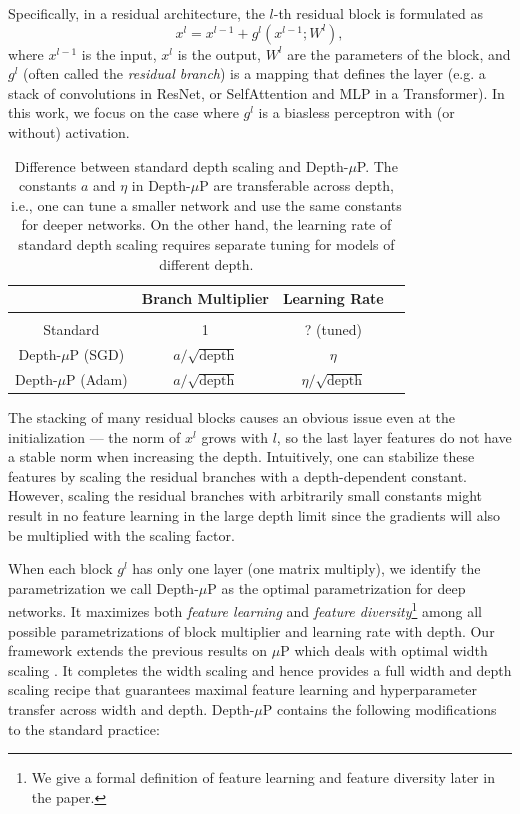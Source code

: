 Specifically, in a residual architecture, the $l$-th residual block is formulated as
\[x^l=x^{l-1} + g^l(x^{l-1};W^l),\] 
where $x^{l-1}$ is the input, $x^l$ is the output, $W^l$ are the parameters of the block, and $g^l$ (often called the \emph{residual branch}) is a mapping that defines the layer (e.g. a stack of convolutions in ResNet, or SelfAttention and MLP in a Transformer). In this work, we focus on the case where $g^l$ is a biasless perceptron with (or without) activation.

\begin{table}[t]
\begin{center}
\caption{Difference between standard depth scaling and Depth-$\mu$P. The constants $a$ and $\eta$ in Depth-$\mu$P are transferable across depth, i.e., one can tune a smaller network and use the same constants for deeper networks. On the other hand, the learning rate of standard depth scaling requires separate tuning for models of different depth. }
\begin{tabular}{c c c c} 
 \hline
  & Branch Multiplier & Learning Rate  \\
 \hline
 \vspace{-0.7em}
 \\
 Standard & 1 & ? (tuned) \\ 

 Depth-$\mu$P (SGD) & {\color{Maroon} $a/\sqrt{\textrm{depth}}$} & {\color{Maroon} $\eta$} \\ 

 Depth-$\mu$P (Adam) & {\color{Maroon} $a/\sqrt{\textrm{depth}}$} & {\color{Maroon} $\eta/\sqrt{\textrm{depth}}$}  \\
\hline

\end{tabular}
\end{center}
\end{table}

The stacking of many residual blocks causes an obvious issue even at the initialization --- the norm of $x^l$ grows with $l$, so the last layer features do not have a stable norm when increasing the depth. Intuitively, one can stabilize these features by scaling the residual branches with a depth-dependent constant. However, scaling the residual branches with arbitrarily small constants might result in no feature learning in the large depth limit since the gradients will also be multiplied with the scaling factor. 

When each block $g^l$ has only one layer (one matrix multiply), we identify the parametrization we call Depth-$\mu$P as the optimal parametrization for deep networks.
It maximizes both \emph{feature learning} and \emph{feature diversity}\footnote{We give a formal definition of feature learning and feature diversity later in the paper.}  among all possible parametrizations of block multiplier and learning rate with depth.
Our framework extends the previous results on $\mu$P which deals with optimal width scaling \citep{yang2022tensor}. It completes the width scaling and hence provides a full width and depth scaling recipe that guarantees maximal feature learning and hyperparameter transfer across width and depth.  %
Depth-$\mu$P contains the following modifications to the standard practice:

